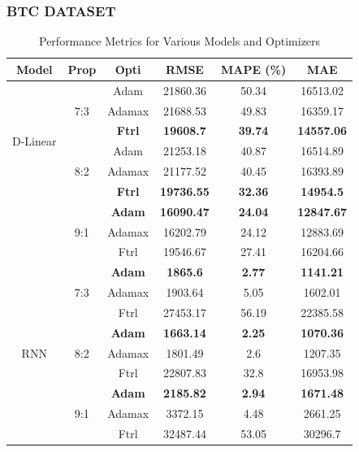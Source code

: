 \documentclass{ieeeojies}
\begin{document}
\subsubsection{BTC DATASET}
\begin{table}[H]
    \centering
    \caption{Performance Metrics for Various Models and Optimizers}
    \begin{tabular}{|c|c|c|c|c|c|}
        \hline
        \rowcolor{ao(english)}
        Model & Prop & Opti & RMSE & MAPE (\%) & MAE \\ \hline
        
        \multirow{6}{*}{D-Linear} & \multirow{3}{*}{7:3} & Adam & 21860.36 & 50.34 & 16513.02 \\ \cline{3-6}
         &  & Adamax & 21688.53 & 49.83 & 16359.17 \\ \cline{3-6}
         &  & \textbf{Ftrl} & \textbf{19608.7} & \textbf{39.74} & \textbf{14557.06} \\ \cline{2-6}
         & \multirow{3}{*}{8:2} & Adam & 21253.18 & 40.87 & 16514.89 \\ \cline{3-6}
         &  & Adamax & 21177.52 & 40.45 & 16393.89 \\ \cline{3-6}
         &  & \textbf{Ftrl} & \textbf{19736.55} & \textbf{32.36} & \textbf{14954.5} \\ \cline{2-6}
         & \multirow{3}{*}{9:1} & \textbf{Adam} & \textbf{16090.47} & \textbf{24.04} & \textbf{12847.67} \\ \cline{3-6}
         & & Adamax & 16202.79 & 24.12 & 12883.69\\ \cline{3-6}
         &  & Ftrl & 19546.67 & 27.41 & 16204.66 \\ \hline
         
        \multirow{9}{*}{RNN} & \multirow{3}{*}{7:3} & \textbf{Adam} & \textbf{1865.6} & \textbf{2.77} & \textbf{1141.21} \\ \cline{3-6}
         &  & Adamax & 1903.64 & 5.05& 1602.01 \\ \cline{3-6}
         &  & Ftrl & 27453.17 & 56.19 & 22385.58 \\ \cline{2-6}
         & \multirow{3}{*}{8:2} & \textbf{Adam} & \textbf{1663.14} & \textbf{2.25} & \textbf{1070.36} \\ \cline{3-6}
         &  & Adamax & 1801.49 & 2.6 & 1207.35 \\ \cline{3-6}
         &  & Ftrl & 22807.83 & 32.8 & 16953.98 \\ \cline{2-6}
         & \multirow{3}{*}{9:1} & \textbf{Adam} & \textbf{2185.82} & \textbf{2.94} & \textbf{1671.48} \\ \cline{3-6}
         &  & Adamax & 3372.15 & 4.48 & 2661.25 \\ \cline{3-6}
         &  & Ftrl & 32487.44 & 53.05 & 30296.7 \\ \hline
         

\end{tabular}
\end{table}
\end{document}
